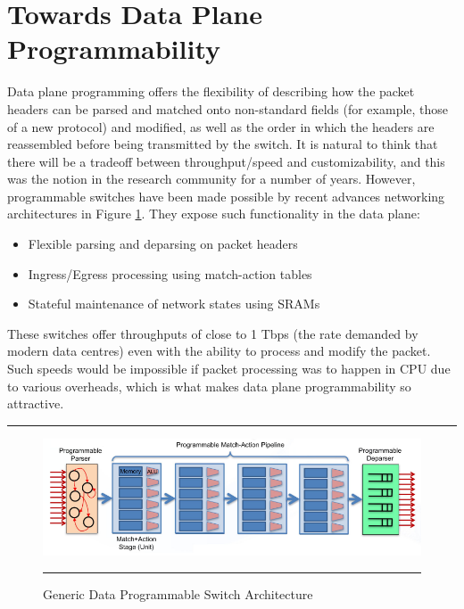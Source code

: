 \section{Towards Data Plane Programmability}
Data plane programming offers the flexibility of describing how the packet headers can be parsed and matched onto non-standard
fields (for example, those of a new protocol) and modified, as well as the order in which the headers are reassembled before being
transmitted by the switch. It is natural to think that there will be a tradeoff between throughput/speed and customizability, and this 
was the notion in the research community for a number of years. However, programmable switches have been made possible by recent 
advances networking architectures\cite{forwardingMeta} in Figure \ref{fig:Match Action}. They expose such functionality in the data plane:
\begin{itemize}
  \item Flexible parsing and deparsing on packet headers
  \item Ingress/Egress processing using match-action tables
  \item Stateful maintenance of network states using SRAMs
\end{itemize}
These switches offer throughputs of close to 1 Tbps (the rate demanded by modern data centres) even with the ability to process and modify the packet. Such speeds would be impossible if packet processing was to happen in CPU due to various overheads, which is what makes data plane programmability so attractive.
\newline
\rule{\textwidth}{0.4pt}
\begin{figure}[htbp]
	\centering
		\includegraphics[width=0.93\columnwidth]{Figures/MatchAction.png}
		\rule{35em}{0.5pt}
	\caption[Match Action Pipeline]{Generic Data Programmable Switch Architecture}
	\label{fig:Match Action}
\end{figure}

